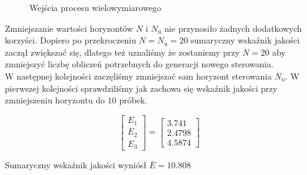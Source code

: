 \begin{figure}
    \begin{subfigure}[b]{\textwidth}
        \centering
    \end{subfigure}
    \caption{Wejścia procesu wielowymiarowego}
    \label{pro_dmc_1_in}
\end{figure}
\FloatBarrier


Zmniejszanie wartości horyzontów $N$ i $N_{\mathrm{u}}$ nie przynosiło żadnych dodatkowych
korzyści. Dopiero po przekroczeniu $N = N_{\mathrm{u}} = \num{20}$ sumaryczny wskaźnik jakości
zaczął zwiększać się, dlatego też uznaliśmy że zostaniemy przy $N = \num{20}$ aby zmniejszyć liczbę
obliczeń potrzebnych do generacji nowego sterowania.\\

W następnej kolejności zaczęliśmy zmniejszać sam horyzont sterowania $N_{\mathrm{u}}$.
W pierwszej kolejności sprawdziliśmy jak zachowa się wskaźnik jakości przy zmniejszeniu
horyzontu do $\num{10}$ próbek.

\[
\begin{bmatrix}
    E_{\mathrm{1}} \\
    E_{\mathrm{2}} \\
    E_{\mathrm{3}} 
\end{bmatrix}
= 
\begin{bmatrix}
    \num{3.741} \\
    \num{2.4798} \\
    \num{4.5874}
\end{bmatrix}
\]

Sumaryczny wskaźnik jakości wyniósł $\bar{E} = \num{10.808}$\\

